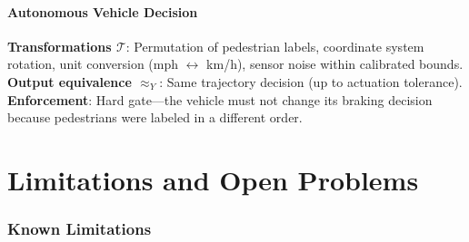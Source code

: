 \documentclass[12pt,letterpaper]{article}
\theoremstyle{definition}
\theoremstyle{plain}
\newcommand{\calT}{\mathcal{T}}
\newcommand{\equivY}{\approx_Y}
\begin{document}
\subsection{Autonomous Vehicle Decision}

\textbf{Transformations $\calT$}: Permutation of pedestrian labels, coordinate system rotation, unit conversion (mph $\leftrightarrow$ km/h), sensor noise within calibrated bounds.\\
\textbf{Output equivalence $\equivY$}: Same trajectory decision (up to actuation tolerance).\\
\textbf{Enforcement}: Hard gate---the vehicle must not change its braking decision because pedestrians were labeled in a different order.


\part{Limitations and Open Problems}
\label{part:limitations}

\section{Known Limitations}
\label{sec:limitations}
\end{document}
